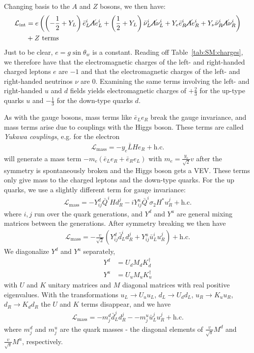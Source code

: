 Changing basis to the $A$ and $Z$ bosons, we then have:
\begin{align}
  \mathcal{L}_\text{int} &= e\left(\left(-\frac{1}{2}+Y_L\right)\bar{e}^i_L\cancel{A}e^i_L
              + \left(\frac{1}{2}+Y_L\right)\bar{\nu}^i_L\cancel{A}\nu^i_L
              + Y_e \bar{e}^i_R\cancel{A}e^i_R + Y_\nu \bar{\nu}^i_R\cancel{A}\nu^i_R\right)\nonumber \\
              &+ \text{$Z$ terms}
\end{align}
Just to be clear, $e=g\sin\theta_w$ is a constant.
Reading off Table~\ref{tab:SM:charges}, we therefore have that the electromagnetic charges of the left- and right-handed charged leptons $e$ are $-1$ and that the electromagnetic charges of the left- and right-handed neutrinos $\nu$ are $0$.
Examining the same terms involving the left- and right-handed $u$ and $d$ fields yields electromagnetic charges of $+\frac{2}{3}$ for the up-type quarks $u$ and $-\frac{1}{3}$ for the down-type quarks $d$.

As with the gauge bosons, mass terms like $\bar{e}_L e_R$ break the gauge invariance, and mass terms arise due to couplings with the Higgs boson.
These terms are called \textit{Yukawa couplings}, e.g. for the electron
\begin{align}
  \mathcal{L}_\text{mass} = -y_e\bar{L}He_R + \text{h.c.}
\end{align}
will generate a mass term $-m_e (\bar{e}_Le_R+\bar{e}_Re_L)$ with $m_e = \frac{y_e}{\sqrt{2}}v $ after the symmetry is spontaneously broken and the Higgs boson gets a VEV.
These terms only give mass to the charged leptons and the down-type quarks.
For the up quarks, we use a slightly different term for gauge invariance:
\begin{align}
  \mathcal{L}_\text{mass} = -Y^d_{ij}\bar{Q}^i H d_R^j - iY_{ij}^u\bar{Q}^i\sigma_2H^*u_R^j + \text{h.c.}
\end{align}
where $i,j$ run over the quark generations, and $Y^d$ and $Y^u$ are general mixing matrices between the generations.
After symmetry breaking we then have
\begin{align}
  \mathcal{L}_\text{mass} = -\frac{v}{\sqrt{2}}\left(Y_{ij}^d\bar{d}_L^id_R^j + Y_{ij}^u\bar{u}_L^iu_R^j\right) + \text{h.c.}
\end{align}
We diagonalize $Y^d$ and $Y^u$ separately,
\begin{align}
  Y^d &= U_dM_dK_d^\dagger\\
  Y^u &= U_uM_uK_u^\dagger
\end{align}
with $U$ and $K$ unitary matrices and $M$ diagonal matrices with real positive eigenvalues.
With the transformations $u_L\rightarrow U_u u_L$, $d_L\rightarrow U_d d_L$, $u_R\rightarrow K_u u_R$, $d_R\rightarrow K_d d_R$ the $U$ and $K$ terms disappear, and we have
\begin{align}
  \mathcal{L}_\text{mass} = -m_j^d \bar{d}_L^jd_R^j - -m_j^u \bar{u}_L^ju_R^j +\text{h.c.}
\end{align}
where $m_j^d$ and $m_j^u$ are the quark masses - the diagonal elements of $\frac{v}{\sqrt{s}}M^d$ and $\frac{v}{\sqrt{s}}M^u$, respectively.

